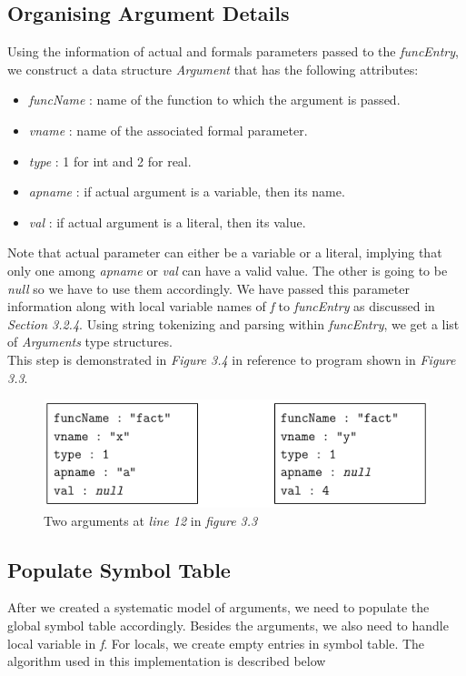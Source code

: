 \documentclass[12pt,oneside]{book}
\begin{document}
\subsection{Organising Argument Details}
Using the information of actual and formals parameters passed to the \textit{funcEntry}, we construct a data structure \textit{Argument} that has the following attributes: 
\begin{itemize}
\setlength\itemsep{0em}
 \item \textit{funcName} : name of the function to which the argument is passed.
 \item \textit{vname} : name of the associated formal parameter.
  \item \textit{type} : 1 for int and 2 for real.
 \item \textit{apname} : if actual argument is a variable, then its name.
  \item \textit{val} : if actual argument is a literal, then its value. 
\end{itemize}
Note that actual parameter can either be a variable or a literal, implying that only one among \textit{apname} or \textit{val} can have a valid value. The other is going to be \textit{null} so we have to use them accordingly. We have passed this parameter information along with local variable names of \textit{f} to \textit{funcEntry} as discussed in \textit{Section 3.2.4}. Using string tokenizing and parsing within \textit{funcEntry}, we get a list of \textit{Arguments} type structures.\\
This step is demonstrated in \textit{Figure 3.4} in reference to program shown in \textit{Figure 3.3}.

\vspace{0.4cm}
\begin{figure}[htbp]
\centering
\includegraphics[scale=0.60]{arguments1.png}
\caption{Two arguments at \textit{line 12} in \textit{figure 3.3}}
\end{figure}


\subsection{Populate Symbol Table}
After we created a systematic model of arguments, we need to populate the global symbol table accordingly. Besides the arguments, we also need to handle local variable in \textit{f}. For locals, we create empty entries in symbol table. The algorithm used in this implementation is described below\\
\end{document}
